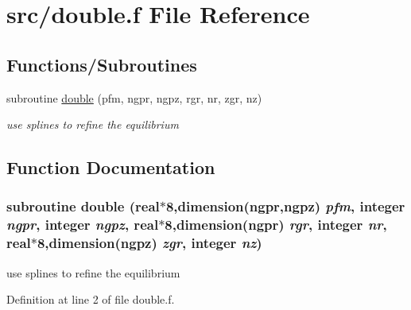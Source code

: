 \hypertarget{double_8f}{
\section{src/double.f File Reference}
\label{double_8f}
}
\subsection*{Functions/Subroutines}
\begin{CompactItemize}
\item 
subroutine \hyperlink{double_8f_639b51ff3554881589a55df2cdbd9d0c}{double} (pfm, ngpr, ngpz, rgr, nr, zgr, nz)
\begin{CompactList}\small\item\em use splines to refine the equilibrium \item\end{CompactList}\end{CompactItemize}


\subsection{Function Documentation}
\hypertarget{double_8f_639b51ff3554881589a55df2cdbd9d0c}{
\subsubsection[double]{\setlength{\rightskip}{0pt plus 5cm}subroutine double (real$\ast$8,dimension(ngpr,ngpz) {\em pfm}, \/  integer {\em ngpr}, \/  integer {\em ngpz}, \/  real$\ast$8,dimension(ngpr) {\em rgr}, \/  integer {\em nr}, \/  real$\ast$8,dimension(ngpz) {\em zgr}, \/  integer {\em nz})}}
\label{double_8f_639b51ff3554881589a55df2cdbd9d0c}


use splines to refine the equilibrium 



Definition at line 2 of file double.f.